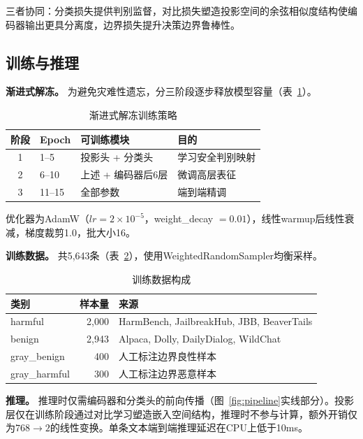 \documentclass[conference]{IEEEtran}
\begin{document}
三者协同：分类损失提供判别监督，对比损失塑造投影空间的余弦相似度结构使编码器输出更具分离度，边界损失提升决策边界鲁棒性。

\subsection{训练与推理}

\textbf{渐进式解冻。} 为避免灾难性遗忘，分三阶段逐步释放模型容量（表~\ref{tab:unfreezing}）。

\begin{table}[t]
\centering
\caption{渐进式解冻训练策略}
\label{tab:unfreezing}
\begin{tabular}{clll}
\toprule
\textbf{阶段} & \textbf{Epoch} & \textbf{可训练模块} & \textbf{目的} \\
\midrule
1 & 1--5 & 投影头 + 分类头 & 学习安全判别映射 \\
2 & 6--10 & 上述 + 编码器后6层 & 微调高层表征 \\
3 & 11--15 & 全部参数 & 端到端精调 \\
\bottomrule
\end{tabular}
\end{table}

优化器为AdamW（$lr = 2 \times 10^{-5}$，weight\_decay $= 0.01$），线性warmup后线性衰减，梯度裁剪1.0，批大小16。

\textbf{训练数据。} 共5,643条（表~\ref{tab:training_data}），使用WeightedRandomSampler均衡采样。

\begin{table}[t]
\centering
\caption{训练数据构成}
\label{tab:training_data}
\begin{tabular}{lrl}
\toprule
\textbf{类别} & \textbf{样本量} & \textbf{来源} \\
\midrule
harmful & 2,000 & HarmBench, JailbreakHub, JBB, BeaverTails \\
benign & 2,943 & Alpaca, Dolly, DailyDialog, WildChat \\
gray\_benign & 400 & 人工标注边界良性样本 \\
gray\_harmful & 300 & 人工标注边界恶意样本 \\
\bottomrule
\end{tabular}
\end{table}

\textbf{推理。} 推理时仅需编码器和分类头的前向传播（图~\ref{fig:pipeline}实线部分）。投影层仅在训练阶段通过对比学习塑造嵌入空间结构，推理时不参与计算，额外开销仅为$768 \rightarrow 2$的线性变换。单条文本端到端推理延迟在CPU上低于10ms。
\end{document}
